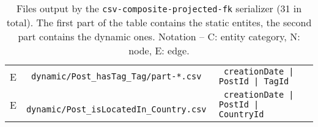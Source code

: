 \begin{table}[htb]
\begin{tabularx}{\linewidth}{|>{\sffamily}c|>{\tt}l|>{\tt}X|}
        E                    & dynamic/Post\_hasTag\_Tag/part-*.csv                & creationDate | PostId | TagId \\
        E                    & dynamic/Post\_isLocatedIn\_Country.csv              & creationDate | PostId | CountryId \\
        \hline
    \end{tabularx}
    \caption{Files output by the \texttt{csv-composite-projected-fk} serializer (31 in total). The first part of the table contains the static entites, the second part contains the dynamic ones.
        Notation -- \textsf{C}: entity category, \textsf{N}: node, \textsf{E}: edge.}
    \label{table:csv-composite-projected-fk}
\end{table}
